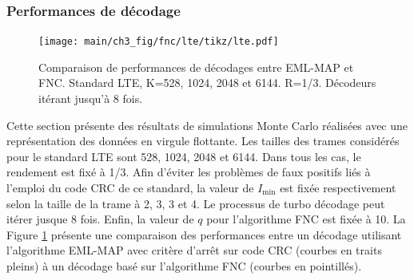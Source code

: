 \subsubsection{Performances de décodage}
\begin{figure}[!t]
	\centering
	\texttt{[image: main/ch3\_fig/fnc/lte/tikz/lte.pdf]}
	\caption{Comparaison de performances de décodages entre EML-MAP et FNC. Standard LTE, K=528, 1024, 2048 et 6144. R=1/3.
	Décodeurs itérant jusqu'à 8 fois. \label{fig:fnc_lte}}
\end{figure}
Cette section présente des résultats de simulations Monte Carlo réalisées avec une représentation des données en 
virgule flottante.
Les tailles des trames considérés pour le standard LTE sont 528, 1024, 2048 et 6144. Dans tous les cas, le rendement
est fixé à 1/3. Afin d'éviter les problèmes de
faux positifs liés à l'emploi du code CRC de ce standard, la valeur de $I_\text{min}$ est fixée respectivement selon la 
taille de la trame à 2, 3, 3 et 4. Le processus
de turbo décodage peut itérer jusque 8 fois. Enfin, la valeur de $q$ pour l'algorithme FNC est fixée à 10. La Figure 
\ref{fig:fnc_lte} présente une comparaison des performances entre un décodage utilisant l'algorithme EML-MAP avec critère 
d'arrêt sur code CRC (courbes en traits pleins) à un décodage basé sur l'algorithme FNC (courbes en pointillés).

